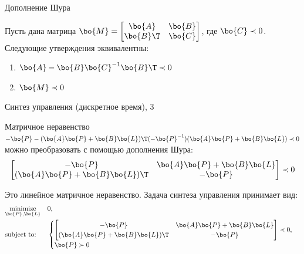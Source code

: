\documentclass{beamer}
\begin{document}
\begin{frame}{Дополнение Шура}
	\begin{flushleft}
		
		\begin{theorem}
			Пусть дана матрица $\bo{M} = \begin{bmatrix}
				\bo{A} & \bo{B} \\
				\bo{B}\T & \bo{C}
			\end{bmatrix}$, где $\bo{C} \prec 0$. 
			Следующие утверждения эквивалентны:
			\begin{enumerate}
				\item $\bo{A} - \bo{B} \bo{C}^{-1}\bo{B}\T \prec 0$
				\item $\bo{M} \prec 0$
			\end{enumerate}
		\end{theorem}
		
		
		
	\end{flushleft}
\end{frame}


\begin{frame}{Синтез управления (дискретное время), 3}
	\begin{flushleft}
		
		Матричное неравенство $-\bo{P} - (\bo{A}\bo{P} + \bo{B}\bo{L})\T (-\bo{P}^{-1}) (\bo{A}\bo{P} + \bo{B}\bo{L})  \prec 0$ можно преобразовать с помощью дополнения Шура:
		\begin{align}
			\begin{bmatrix}
				-\bo{P} & \bo{A}\bo{P} + \bo{B}\bo{L} \\
				(\bo{A}\bo{P} + \bo{B}\bo{L})\T & -\bo{P}
			\end{bmatrix}  \prec 0
		\end{align}
		
		Это линейное матричное неравенство. Задача синтеза управления принимает вид:
		\begin{equation}
			\label{control_design_discrete}
			\begin{aligned}
				& \underset{\bo{P}, \bo{L}}{\text{minimize}} 
				& &  0, \\
				& \text{subject to:} & & 
				\begin{cases}
					\begin{bmatrix}
						-\bo{P} & \bo{A}\bo{P} + \bo{B}\bo{L} \\
						(\bo{A}\bo{P} + \bo{B}\bo{L})\T & -\bo{P}
					\end{bmatrix}  \prec 0, \\ 
					\bo{P} \succ 0
				\end{cases}
			\end{aligned}
		\end{equation}
		
		
		
	\end{flushleft}
\end{frame}
\end{document}
